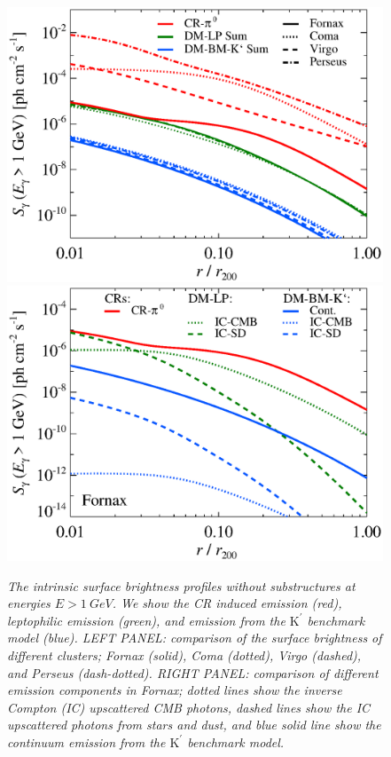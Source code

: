\documentclass[10pt,aps,pra,reprint,amsmath,amsfonts,amssymb,showpacs,nofootinbib,floatfix]{revtex4-1}
\newcommand{\rmn}{\mathrm}
\newcommand{\Kp}{\rmn{K}^\prime}
\begin{document}
\begin{figure}
\begin{minipage}{2.0\columnwidth}
  \includegraphics[width=0.49\columnwidth]{figures/SB.v11.1GeV.SF300.noSuB.elmu.eps}
  \includegraphics[width=0.49\columnwidth]{figures/SB.fornax.v11.1GeV.SF300.noSuB.elmu.eps}
  \caption{\it The intrinsic surface brightness profiles without
    substructures at energies $E>1\ GeV$. We show the CR induced
    emission (red), leptophilic emission (green), and emission from
    the $\Kp$ benchmark model (blue).  LEFT PANEL: comparison of the surface
    brightness of different clusters; Fornax (solid), Coma (dotted),
    Virgo (dashed), and Perseus (dash-dotted). RIGHT PANEL: comparison of
    different emission components in Fornax; dotted lines show the
    inverse Compton (IC) upscattered CMB photons, dashed lines show
    the IC upscattered photons from stars and dust, and blue solid
    line show the continuum emission from the $\Kp$ benchmark model.}
 \label{fig:SB_clu_nosub}
\end{minipage}
\end{figure}
\end{document}
